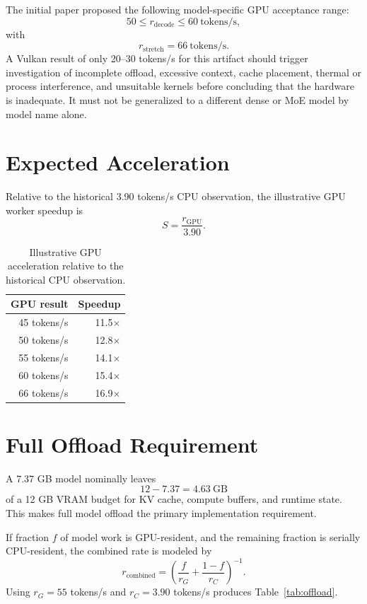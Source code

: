 \documentclass[11pt]{article}
\begin{document}
The initial paper proposed the following model-specific GPU acceptance range:
\[
50 \leq r_{\mathrm{decode}} \leq 60\ \text{tokens/s},
\]
with
\[
r_{\mathrm{stretch}} = 66\ \text{tokens/s}.
\]
A Vulkan result of only 20--30 tokens/s for this artifact should trigger investigation of incomplete offload, excessive context, cache placement, thermal or process interference, and unsuitable kernels before concluding that the hardware is inadequate. It must not be generalized to a different dense or MoE model by model name alone.

\section{Expected Acceleration}

Relative to the historical 3.90 tokens/s CPU observation, the illustrative GPU worker speedup is
\[
S = \frac{r_{\mathrm{GPU}}}{3.90}.
\]

\begin{table}[h]
\centering
\caption{Illustrative GPU acceleration relative to the historical CPU observation.}
\begin{tabular}{rr}
\toprule
GPU result & Speedup \\
\midrule
45 tokens/s & 11.5$\times$ \\
50 tokens/s & 12.8$\times$ \\
55 tokens/s & 14.1$\times$ \\
60 tokens/s & 15.4$\times$ \\
66 tokens/s & 16.9$\times$ \\
\bottomrule
\end{tabular}
\end{table}

\section{Full Offload Requirement}

A 7.37 GB model nominally leaves
\[
12 - 7.37 = 4.63\ \text{GB}
\]
of a 12 GB VRAM budget for KV cache, compute buffers, and runtime state. This makes full model offload the primary implementation requirement.

If fraction $f$ of model work is GPU-resident, and the remaining fraction is serially CPU-resident, the combined rate is modeled by
\[
r_{\mathrm{combined}} =
\left(
\frac{f}{r_G} + \frac{1-f}{r_C}
\right)^{-1}.
\]
Using $r_G=55$ tokens/s and $r_C=3.90$ tokens/s produces Table~\ref{tab:offload}.
\end{document}
